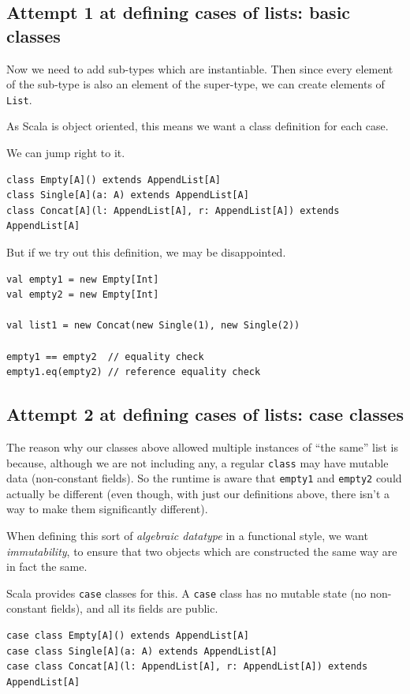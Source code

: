 \documentclass[11pt]{article}
\begin{document}
\subsection{Attempt 1 at defining cases of lists: basic classes}
\label{sec:orge599669}
Now we need to add sub-types which are instantiable.
Then since every element of the sub-type is also an element
of the super-type, we can create elements of \texttt{List}.

As Scala is object oriented, this means we want
a class definition for each case.

We can jump right to it.
\begin{verbatim}
class Empty[A]() extends AppendList[A]
class Single[A](a: A) extends AppendList[A]
class Concat[A](l: AppendList[A], r: AppendList[A]) extends AppendList[A]
\end{verbatim}

But if we try out this definition, we may be disappointed.
\begin{verbatim}
val empty1 = new Empty[Int]
val empty2 = new Empty[Int]

val list1 = new Concat(new Single(1), new Single(2))

empty1 == empty2  // equality check
empty1.eq(empty2) // reference equality check
\end{verbatim}

\subsection{Attempt 2 at defining cases of lists: case classes}
\label{sec:orgc117080}
The reason why our classes above allowed multiple instances
of “the same” list is because, although we are not including any,
a regular \texttt{class} may have mutable data (non-constant fields).
So the runtime is aware that \texttt{empty1} and \texttt{empty2} could
actually be different (even though, with just our definitions above,
there isn't a way to make them significantly different).

When defining this sort of \emph{algebraic datatype} in a
functional style, we want \emph{immutability}, to ensure that
two objects which are constructed the same way
are in fact the same.

Scala provides \texttt{case} classes for this.
A \texttt{case} class has no mutable state (no non-constant fields),
and all its fields are public.
\begin{verbatim}
case class Empty[A]() extends AppendList[A]
case class Single[A](a: A) extends AppendList[A]
case class Concat[A](l: AppendList[A], r: AppendList[A]) extends AppendList[A]
\end{verbatim}
\end{document}
